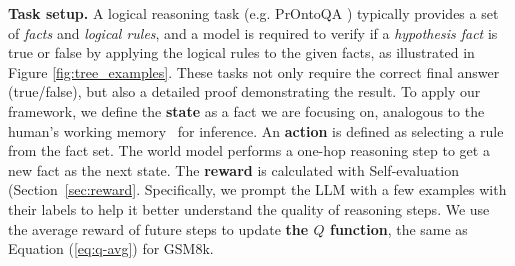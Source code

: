 \noindent \textbf{Task setup.}
A logical reasoning task (e.g. PrOntoQA \cite{saparov2022language}) typically provides a set of \emph{facts} and \emph{logical rules}, and a model is required to verify if a \emph{hypothesis fact} is true or false by applying the logical rules to the given facts, as illustrated in Figure \ref{fig:tree_examples}. These tasks not only require the correct final answer (true/false), but also a detailed proof demonstrating the result. To apply our framework, we define the \textbf{state} as a fact we are focusing on, analogous to the human's working memory~\cite{baddeley1992working} for inference. 
An \textbf{action} is defined as selecting a rule from the fact set. The world model performs a one-hop reasoning step to get a new fact as the next state. The \textbf{reward} is calculated with Self-evaluation (Section~\ref{sec:reward}. Specifically, we prompt the LLM with a few examples with their labels to help it better understand the quality of reasoning steps.
We use the average reward of future steps to update \textbf{the $Q$ function}, the same as Equation (\ref{eq:q-avg}) for GSM8k.


